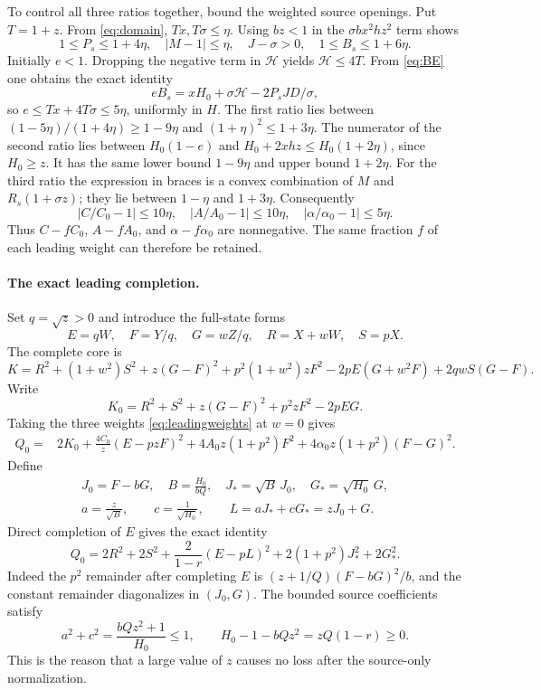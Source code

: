 \documentclass[11pt]{article}
\begin{document}
To control all three ratios together, bound the weighted source openings.
Put $T=1+z$. From \eqref{eq:domain}, $Tx,T\sigma\le\eta$.
Using $bz<1$ in the $\sigma bx^2hz^2$ term shows
\[
 1\le P_s\le1+4\eta,\quad |M-1|\le\eta,\quad
 J-\sigma>0,\quad 1\le B_s\le1+6\eta.
\]
Initially $e<1$. Dropping the negative term in $\mathcal H$ yields
$\mathcal H\le4T$. From \eqref{eq:BE} one obtains the exact identity
\[
 eB_s=xH_0+\sigma\mathcal H-2P_sJD/\sigma,
\]
so $e\le Tx+4T\sigma\le5\eta$, uniformly in $H$. The first ratio lies between
$(1-5\eta)/(1+4\eta)\ge1-9\eta$ and
$(1+\eta)^2\le1+3\eta$.
The numerator of the second ratio lies between
$H_0(1-e)$ and $H_0+2xhz\le H_0(1+2\eta)$, since $H_0\ge z$.
It has the same lower bound $1-9\eta$ and upper bound $1+2\eta$.
For the third ratio the expression in braces is a convex combination
of $M$ and $R_s(1+\sigma z)$; they lie between $1-\eta$ and
$1+3\eta$. Consequently
\begin{equation}\label{eq:ratioest}
 \left|C/C_0-1\right|\le10\eta,\quad
 \left|A/A_0-1\right|\le10\eta,\quad
 \left|\alpha/\alpha_0-1\right|\le5\eta.
\end{equation}
Thus $C-fC_0$, $A-fA_0$, and $\alpha-f\alpha_0$ are nonnegative.
The same fraction $f$ of each leading weight can therefore be retained.

\paragraph{The exact leading completion.}
Set $q=\sqrt z>0$ and introduce the full-state forms
\[
 E=qW,\quad F=Y/q,\quad G=wZ/q,\quad
 R=X+wW,\quad S=pX.
\]
The complete core is
\begin{equation}\label{eq:core}
 K=R^2+(1+w^2)S^2+z(G-F)^2
    +p^2(1+w^2)zF^2
    -2pE(G+w^2F)+2qwS(G-F).
\end{equation}
Write
\[
 K_0=R^2+S^2+z(G-F)^2+p^2zF^2-2pEG.
\]
Taking the three weights \eqref{eq:leadingweights} at $w=0$ gives
\begin{align*}
 Q_0={}&2K_0+\frac{4C_0}{z}(E-pzF)^2
          +4A_0z(1+p^2)F^2
          +4\alpha_0z(1+p^2)(F-G)^2.
\end{align*}
Define
\begin{gather*}
 J_0=F-bG,\quad B=\frac{H_0}{bQ},\quad
 J_* =\sqrt B\,J_0,\quad G_* =\sqrt{H_0}\,G,\\
 a=\frac z{\sqrt B},\qquad c=\frac1{\sqrt{H_0}},\qquad
 L=aJ_*+cG_*=zJ_0+G.
\end{gather*}
Direct completion of $E$ gives the exact identity
\begin{equation}\label{eq:leadingidentity}
 Q_0=2R^2+2S^2+\frac2{1-r}(E-pL)^2
              +2(1+p^2)J_*^2+2G_*^2.
\end{equation}
Indeed the $p^2$ remainder after completing $E$ is
$(z+1/Q)(F-bG)^2/b$, and the constant remainder diagonalizes in
$(J_0,G)$. The bounded source coefficients satisfy
\begin{equation}\label{eq:ac}
 a^2+c^2=\frac{bQz^2+1}{H_0}\le1,
 \qquad H_0-1-bQz^2=zQ(1-r)\ge0.
\end{equation}
This is the reason that a large value of $z$ causes no loss after the
source-only normalization.
\end{document}

